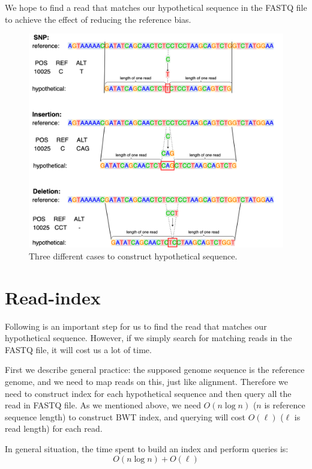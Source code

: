 We hope to find a read that matches our hypothetical sequence in the FASTQ file to achieve the effect of reducing the reference bias.

\begin{figure}[H]
\includegraphics[width=1\columnwidth]{body/image/3-4.png}
\caption[construct hypothetical sequence]{Three different cases to construct hypothetical sequence.}
\label{f3-4}
\end{figure}

\section{Read-index}

Following is an important step for us to find the read that matches our hypothetical sequence. However, if we simply search for matching reads in the FASTQ file, it will cost us a lot of time. 

First we describe general practice: the supposed genome sequence is the reference genome, and we need to map reads on this, just like alignment. Therefore we need to construct index for each hypothetical sequence and then query all the read in FASTQ file. As we mentioned above, we need $O(n\log n)$  ($n$ is reference sequence length) to construct BWT index, and querying will cost $O(\ell)$ ($\ell$ is read length) for each read.

In general situation, the time spent to build an index and perform queries is:
\begin{equation*}
O(n \log n) + O(\ell)
\end{equation*}

